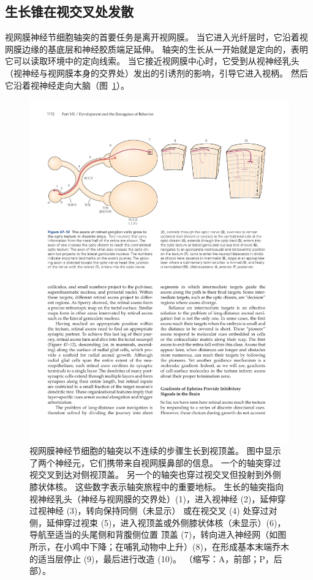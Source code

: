 \subsection{生长锥在视交叉处发散}

视网膜神经节细胞轴突的首要任务是离开视网膜。
当它进入光纤层时，它沿着视网膜边缘的基底层和神经胶质端足延伸。
轴突的生长从一开始就是定向的，表明它可以读取环境中的定向线索。
当它接近视网膜中心时，它受到从视神经乳头（视神经与视网膜本身的交界处）发出的引诱剂的影响，引导它进入视柄。
然后它沿着视神经走向大脑（图~\ref{fig:47_12}）。


\begin{figure}[htbp]
	\centering
	\includegraphics[width=0.95\linewidth]{chap47/fig_47_12}
	\caption{视网膜神经节细胞的轴突以不连续的步骤生长到视顶盖。
		图中显示了两个神经元，它们携带来自视网膜鼻部的信息。
		一个的轴突穿过视交叉到达对侧视顶盖。
		另一个的轴突也穿过视交叉但投射到外侧膝状体核。
		这些数字表示轴突旅程中的重要地标。
		生长的轴突指向视神经乳头（神经与视网膜的交界处）(1)，进入视神经 (2)，延伸穿过视神经 (3)，转向保持同侧（未显示） 或在视交叉 (4) 处穿过对侧，延伸穿过视束 (5)，进入视顶盖或外侧膝状体核（未显示）(6)，导航至适当的头尾侧和背腹侧位置 顶盖 (7)，转向进入神经网（如图所示，在小鸡中下降；在哺乳动物中上升）(8)，在形成基本末端乔木的适当层停止 (9)，最后进行改造 (10)。 （缩写：A，前部；P，后部）。}
	\label{fig:47_12}
\end{figure}


